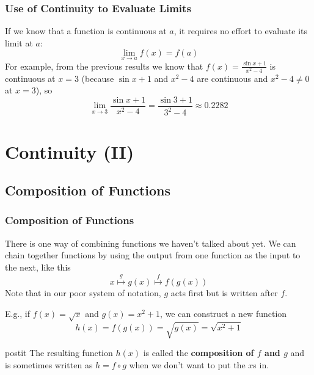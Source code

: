\documentclass[serif,ignorenonframetext]{beamer}
\newcommand{\ds}{\displaystyle}
\begin{document}
\begin{frame}
  \frametitle{Use of Continuity to Evaluate Limits}
  If we know that a function is continuous at $a$, it requires no
  effort to evaluate its limit at $a$:
  \pause
  \begin{displaymath}
    \lim_{x\to a} f(x) = f(a)
  \end{displaymath}
  \pause
  For example, from the previous results we know that 
  $\ds f(x)=\frac{\sin x+1}{x^2-4}$ is continuous at $x=3$ (because
  $\sin x + 1$ and $x^2-4$ are continuous and $x^2-4\ne 0$ at $x=3$), so
  \pause
  \begin{displaymath}
    \lim_{x\to 3} \frac{\sin x+1}{x^2-4} = \frac{\sin 3+1}{3^2-4} 
    \approx 0.2282
  \end{displaymath}
\end{frame}


\section{Continuity (II)}

\subsection{Composition of Functions}

\begin{frame}
  \frametitle{Composition of Functions}
  There is one way of combining functions we haven't talked about yet.
  We can chain together functions by using the output from one function
  as the input to the next, like this
  \begin{displaymath}
    x \stackrel{g}{\mapsto} g(x) \stackrel{f}{\mapsto} f(g(x))
  \end{displaymath}
  \pause
  Note that in our poor system of notation, $g$ acts first but is
  written after $f$.

  \pause
  E.g., if $f(x)=\sqrt{x}$ and $g(x)=x^2+1$, we can construct
  a new function
  \begin{displaymath}
    h(x) = f(g(x)) = \sqrt{g(x)} = \sqrt{x^2+1}
  \end{displaymath}
  \pause
  \begin{beamercolorbox}{postit}
  The resulting 
  function $h(x)$ is called the 
  \textbf{composition of $f$ and $g$} and is sometimes
  written as $h=f \circ g$ when we don't want to put the $x$s in.
  \end{beamercolorbox}
\end{frame}
\end{document}

